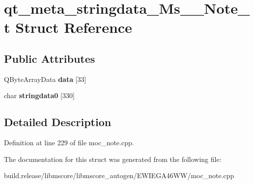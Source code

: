 \hypertarget{structqt__meta__stringdata___ms_____note__t}{}\section{qt\+\_\+meta\+\_\+stringdata\+\_\+\+Ms\+\_\+\+\_\+\+Note\+\_\+t Struct Reference}
\label{structqt__meta__stringdata___ms_____note__t}
\subsection*{Public Attributes}
\begin{DoxyCompactItemize}
\item 
\mbox{\label{structqt__meta__stringdata___ms_____note__t_ac3708cbb226994ad8b90e243313fdcf3}} 
Q\+Byte\+Array\+Data {\bfseries data} \mbox{[}33\mbox{]}
\item 
\mbox{\label{structqt__meta__stringdata___ms_____note__t_af2e96ec7e6097a5963b5cab6f83b962f}} 
char {\bfseries stringdata0} \mbox{[}330\mbox{]}
\end{DoxyCompactItemize}


\subsection{Detailed Description}


Definition at line 229 of file moc\+\_\+note.\+cpp.



The documentation for this struct was generated from the following file\+:\begin{DoxyCompactItemize}
\item 
build.\+release/libmscore/libmscore\+\_\+autogen/\+E\+W\+I\+E\+G\+A46\+W\+W/moc\+\_\+note.\+cpp\end{DoxyCompactItemize}
